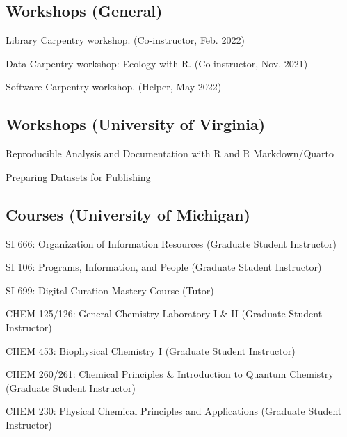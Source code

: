 \documentclass[12pt,letterpaper]{report}
\newcommand{\listitemspace}{0.25em}
\renewenvironment{itemize}
{\begin{list}{}{\setlength{\leftmargin}{0em}
            \setlength{\parskip}{0em}
            \setlength{\itemsep}{\listitemspace}
            \setlength{\parsep}{\listitemspace}}}
{\end{list}}
\begin{document}
\subsection*{Workshops (General)}

\begin{itemize}

	\item Library Carpentry workshop. (Co-instructor, Feb. 2022)
	
	\item Data Carpentry workshop: Ecology with R. (Co-instructor, Nov. 2021)
	
	\item Software Carpentry workshop. (Helper, May 2022)

\end{itemize}

\subsection*{Workshops (University of Virginia)}

\begin{itemize}

	\item Reproducible Analysis and Documentation with R and R Markdown/Quarto

	\item Preparing Datasets for Publishing

\end{itemize}

\subsection*{Courses (University of Michigan)}
    
\begin{itemize}
    	
    	\item SI 666: Organization of Information Resources (Graduate Student Instructor)
        
	\item SI 106: Programs, Information, and People (Graduate Student Instructor)
        
	\item SI 699: Digital Curation Mastery Course (Tutor)
        
	\item CHEM 125/126: General Chemistry Laboratory I \& II (Graduate Student Instructor)
        
	\item CHEM 453: Biophysical Chemistry I (Graduate Student Instructor)
        
	\item CHEM 260/261: Chemical Principles \& Introduction to Quantum Chemistry (Graduate Student Instructor)
        
	\item CHEM 230: Physical Chemical Principles and Applications (Graduate Student Instructor)
    
\end{itemize}
    	
\end{document}
